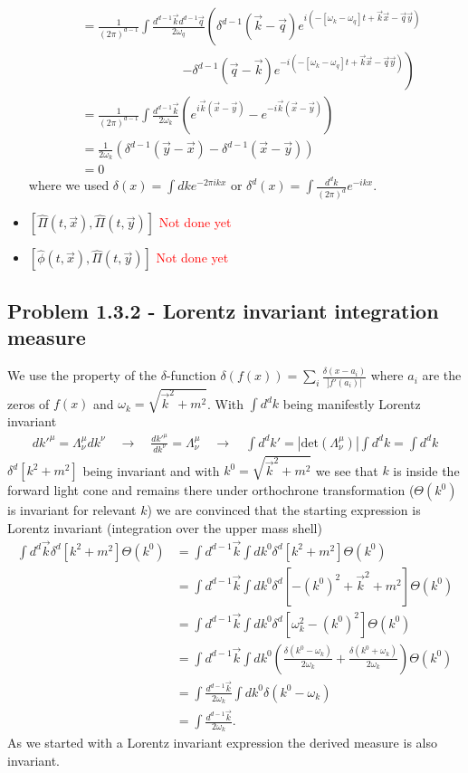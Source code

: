 \documentclass[10pt,a4paper]{book}
\theoremstyle{definition}
\begin{document}
\begin{itemize}
\begin{align}
    &= \frac{1}{(2\pi)^{d-1}}\int \frac{d^{d-1}\vec{k}d^{d-1}\vec{q}}{2 \omega_q}\left(\delta^{d-1}(\vec{k}-\vec{q})e^{i(-[\omega_k-\omega_q]t+\vec{k}\vec{x}-\vec{q}\vec{y})}\right.\\
    &\qquad\qquad\qquad\qquad\left.-\delta^{d-1}(\vec{q}-\vec{k})e^{-i(-[\omega_k-\omega_q]t+\vec{k}\vec{x}-\vec{q}\vec{y})}\right)\\
    &= \frac{1}{(2\pi)^{d-1}}\int \frac{d^{d-1}\vec{k}}{2 \omega_k}\left(e^{i\vec{k}(\vec{x}-\vec{y})}-e^{-i\vec{k}(\vec{x}-\vec{y})}\right)\\
    &= \frac{1}{2 \omega_k}\left( \delta^{d-1}(\vec{y}-\vec{x})-\delta^{d-1}(\vec{x}-\vec{y})\right)\\
    &=0
\end{align}
where we used $\delta(x)=\int dk e^{-2\pi i kx}$ or $\delta^d(x)=\int \frac{d^dk}{(2\pi)^d} e^{-ikx}$.

\item $[\hat\Pi(t,\vec{x}),\hat\Pi(t,\vec{y})]$
\textcolor{red}{Not done yet}
\item $[\hat\phi(t,\vec{x}),\hat\Pi(t,\vec{y})]$
\textcolor{red}{Not done yet}
\end{itemize}

\subsection{Problem 1.3.2 - Lorentz invariant integration measure}
We use the property of the $\delta$-function $\delta(f(x))=\sum_i\frac{\delta(x-a_i)}{]f'(a_i)|}$ where ${a_i}$ are the zeros of $f(x)$ and $\omega_k=\sqrt{\vec{k}^2+m^2}$. With $\int d^dk$ being manifestly Lorentz invariant 
\begin{align}
    dk'^\mu = \Lambda^\mu_\nu dk^\nu\quad\rightarrow\quad \frac{dk'^\mu}{dk^\nu}=\Lambda^\mu_\nu\quad\rightarrow\quad\int d^d k'=|\text{det}(\Lambda^\mu_\nu)|\int d^dk=\int d^dk
\end{align}
$\delta^d[k^2+m^2]$ being invariant and with $k^0=\sqrt{\vec{k}^2+m^2}$ we see that $k$ is inside the forward light cone and remains there under orthochrone transformation ($\Theta(k^0)$ is invariant for relevant $k$) we are convinced that the starting expression is Lorentz invariant (integration over the upper mass shell)
\begin{align}
    \int d^{d}\vec{k} \delta^d[k^2+m^2]\Theta(k^0) &=\int d^{d-1}\vec{k}\int dk^0\delta^d[k^2+m^2]\Theta(k^0)\\
    &=\int d^{d-1}\vec{k}\int dk^0\delta^d[-(k^0)^2+\vec{k}^2+m^2]\Theta(k^0)\\
    &=\int d^{d-1}\vec{k}\int dk^0\delta^d[\omega_k^2-(k^0)^2]\Theta(k^0)\\
    &=\int d^{d-1}\vec{k}\int dk^0\left( \frac{\delta(k^0-\omega_k)}{2\omega_k}+\frac{\delta(k^0+\omega_k)}{2\omega_k} \right)\Theta(k^0)\\
    &=\int \frac{d^{d-1}\vec{k}}{2\omega_k}\int dk^0\delta(k^0-\omega_k)\\
    &=\int\frac{d^{d-1}\vec{k}}{2\omega_k}.
\end{align}
As we started with a Lorentz invariant expression the derived measure is also invariant.
\end{document}
